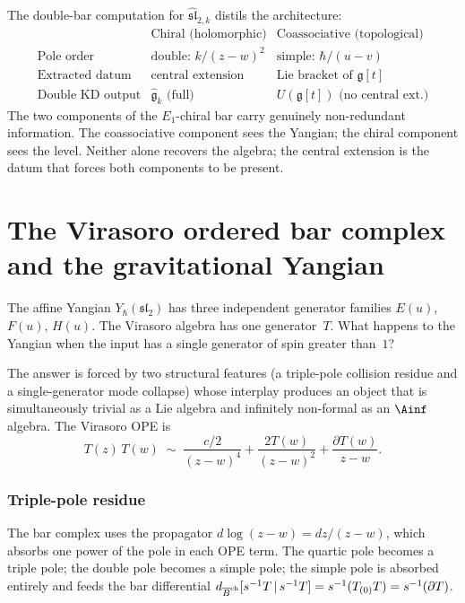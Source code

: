 \begin{remark}
\label{rem:double-bar-architecture}
The double-bar computation for $\widehat{\mathfrak{sl}}_{2,k}$ distils the
architecture:
\[
\begin{array}{c|c|c}
& \text{Chiral (holomorphic)} & \text{Coassociative (topological)} \\
\hline
\text{Pole order} & \text{double: } k/(z-w)^2
 & \text{simple: } \hbar/(u-v) \\
\text{Extracted datum} & \text{central extension}
 & \text{Lie bracket of } \mathfrak{g}[t] \\
\text{Double KD output} & \widehat{\mathfrak{g}}_k \text{ (full)}
 & U(\mathfrak{g}[t]) \text{ (no central ext.)}
\end{array}
\]
The two components of the $E_1$-chiral bar carry genuinely non-redundant
information. The coassociative component sees the Yangian; the chiral component sees
the level. Neither alone recovers the algebra; the central extension
is the datum that forces both components to be present.
\end{remark}


\section{The Virasoro ordered bar complex and the gravitational Yangian}
\label{subsec:virasoro-ordered-bar}

The affine Yangian $Y_\hbar(\mathfrak{sl}_2)$ has three independent
generator families $E(u)$, $F(u)$, $H(u)$. The Virasoro algebra has
one generator~$T$. What happens to the Yangian when the input has a
single generator of spin greater than~$1$?

The answer is forced by two structural features (a triple-pole
collision residue and a single-generator mode collapse) whose
interplay produces an object that is simultaneously trivial as a
Lie algebra and infinitely non-formal as an $\Ainf$ algebra.
The Virasoro OPE is
\begin{equation}\label{eq:virasoro-ope-ordered}
T(z)\,T(w) \;\sim\;
\frac{c/2}{(z-w)^4}
+ \frac{2T(w)}{(z-w)^2}
+ \frac{\partial T(w)}{z-w}.
\end{equation}

\subsubsection*{Triple-pole residue}

The bar complex uses the propagator $d\log(z-w) = dz/(z-w)$, which
absorbs one power of the pole in each OPE term. The quartic
pole becomes a triple pole; the double pole becomes a simple pole; the
simple pole is absorbed entirely and feeds the bar differential
$d_{\overline{B}^{\mathrm{ch}}}[s^{-1}T \,|\, s^{-1}T]
= s^{-1}(T_{(0)}T) = s^{-1}(\partial T)$.

